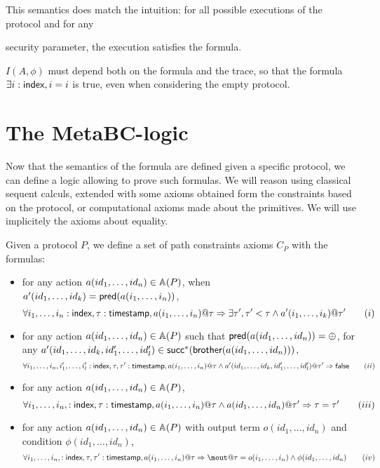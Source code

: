 \documentclass[a4paper]{article}
\theoremstyle{remark}
\begin{document}
This semantics does match the intuition: for all possible executions of the protocol and for any

security parameter, the execution satisfies the formula.

$I(A,\phi)$ must depend both on the formula and the trace, so that the formula $\exists i:\textsf{index}, i=i$ is true, even when considering the empty protocol.


\section{The MetaBC-logic}

Now that the semantics of the formula are defined given a specific protocol, we can define a logic allowing to prove such formulas. We will reason using classical sequent calculs, extended with some axioms obtained form the constraints based on the protocol, or computational axioms made about the primitives. We will use implicitely the axioms about equality.

Given a protocol $P$, we define a set of path constraints axioms $C_P$ with the formulas:
\begin{itemize}
\item for any action $a(id_1,\dots,id_n) \in \mathbb{A}(P)$, when $a'(id_1,\dots,id_k) = \textsf{pred} (a(i_1,\dots,i_n))$,
  \[\forall i_1, \dots, i_n:\textsf{index}, \tau:\textsf{timestamp}, a(i_1,\dots,i_n)@\tau \Rightarrow \exists \tau', \tau'< \tau \wedge a'(i_1,\dots,i_k)@\tau' \qquad (i) \]
\item for any action $a(id_1,\dots,id_n) \in \mathbb{A}(P)$ such that $\textsf{pred} (a(id_1,\dots,id_n)) =
  \oplus$, for any $a'(id_1,\dots,id_k,id'_1,\dots, id'_l) \in \textsf{succ}^*( \textsf{brother} (a(id_1,\dots,id_n)))$,
  \[\forall i_1, \dots, i_n, i'_1,\dots, i'_l:\textsf{index}, \tau,\tau':\textsf{timestamp}, a(i_1,\dots,i_n)@\tau \wedge a'(id_1,\dots,id_k,id'_1,\dots, id'_l)@\tau' \Rightarrow \textsf{false}   \qquad (ii) \]
\item for any action $a(id_1,\dots,id_n) \in \mathbb{A}(P)$,
  \[\forall i_1, \dots, i_n, :\textsf{index}, \tau:\textsf{timestamp}, a(i_1,\dots,i_n)@\tau \wedge a(id_1,\dots,id_n)@\tau' \Rightarrow \tau=\tau'  \qquad (iii)\]
\item for any action $a(id_1,\dots,id_n) \in \mathbb{A}(P)$ with output term $o(id_1,\dots,id_n)$ and condition $\phi(id_1,\dots,id_n)$,
  \[\forall i_1, \dots, i_n, :\idx, \tau,\tau':\timestamp, a(i_1,\dots,i_n)@\tau \Rightarrow \mout@\tau = o(i_1,\dots,i_n) \wedge \phi(id_1,\dots,id_n)   \qquad (iv)\]
\end{itemize}
\end{document}
